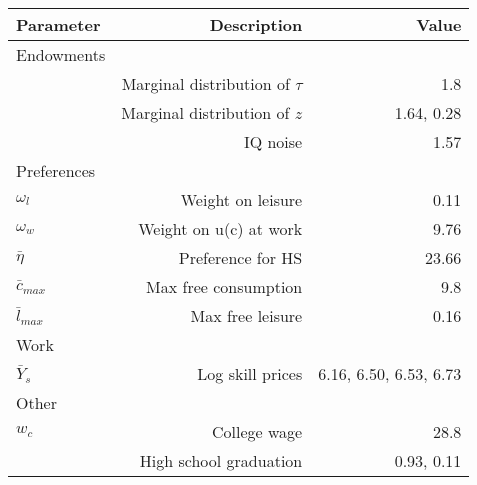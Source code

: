\begin{tabular}{lrr}
\hline
Parameter & Description  & Value  \\ 
\hline
Endowments &   &   \\ 
 & Marginal distribution of $\tau$  & 1.8  \\ 
 & Marginal distribution of $z$  & 1.64, 0.28  \\ 
 & IQ noise  & 1.57  \\ 
Preferences &   &   \\ 
$\omega_{l}$ & Weight on leisure  & 0.11  \\ 
$\omega_{w}$ & Weight on u(c) at work  & 9.76  \\ 
$\bar{\eta}$ & Preference for HS  & 23.66  \\ 
$\bar{c}_{max}$ & Max free consumption  & 9.8  \\ 
$\bar{l}_{max}$ & Max free leisure  & 0.16  \\ 
Work &   &   \\ 
$\bar{Y}_{s}$ & Log skill prices  & 6.16, 6.50, 6.53, 6.73  \\ 
Other &   &   \\ 
$w_{c}$ & College wage  & 28.8  \\ 
 & High school graduation  & 0.93, 0.11  \\ 
\hline
\end{tabular}%
